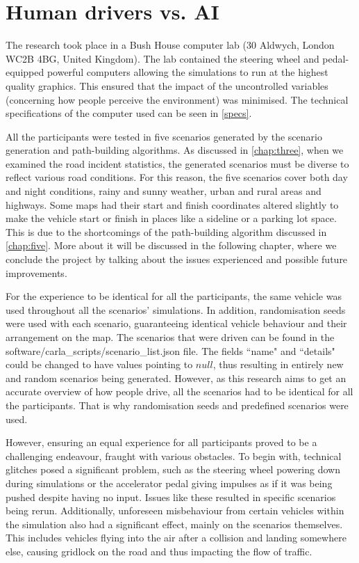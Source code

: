 \section{Human drivers vs. AI} \label{sect-9.2}

The research took place in a Bush House computer lab (30 Aldwych, London WC2B 4BG, United Kingdom). The lab contained the steering wheel and pedal-equipped powerful computers allowing the simulations to run at the highest quality graphics. This ensured that the impact of the uncontrolled variables (concerning how people perceive the environment) was minimised. The technical specifications of the computer used can be seen in \autoref{specs}.

All the participants were tested in five scenarios generated by the scenario generation and path-building algorithms. As discussed in \autoref{chap:three}, when we examined the road incident statistics, the generated scenarios must be diverse to reflect various road conditions. For this reason, the five scenarios cover both day and night conditions, rainy and sunny weather, urban and rural areas and highways. Some maps had their start and finish coordinates altered slightly to make the vehicle start or finish in places like a sideline or a parking lot space. This is due to the shortcomings of the path-building algorithm discussed in \autoref{chap:five}. More about it will be discussed in the following chapter, where we conclude the project by talking about the issues experienced and possible future improvements.

For the experience to be identical for all the participants, the same vehicle was used throughout all the scenarios' simulations. In addition, randomisation seeds were used with each scenario, guaranteeing identical vehicle behaviour and their arrangement on the map. The scenarios that were driven can be found in the software/carla\_scripts/scenario\_list.json file. The fields ``name" and ``details" could be changed to have values pointing to $null$, thus resulting in entirely new and random scenarios being generated. However, as this research aims to get an accurate overview of how people drive, all the scenarios had to be identical for all the participants. That is why randomisation seeds and predefined scenarios were used.

However, ensuring an equal experience for all participants proved to be a challenging endeavour, fraught with various obstacles. To begin with, technical glitches posed a significant problem, such as the steering wheel powering down during simulations or the accelerator pedal giving impulses as if it was being pushed despite having no input. Issues like these resulted in specific scenarios being rerun. Additionally, unforeseen misbehaviour from certain vehicles within the simulation also had a significant effect, mainly on the scenarios themselves. This includes vehicles flying into the air after a collision and landing somewhere else, causing gridlock on the road and thus impacting the flow of traffic.

